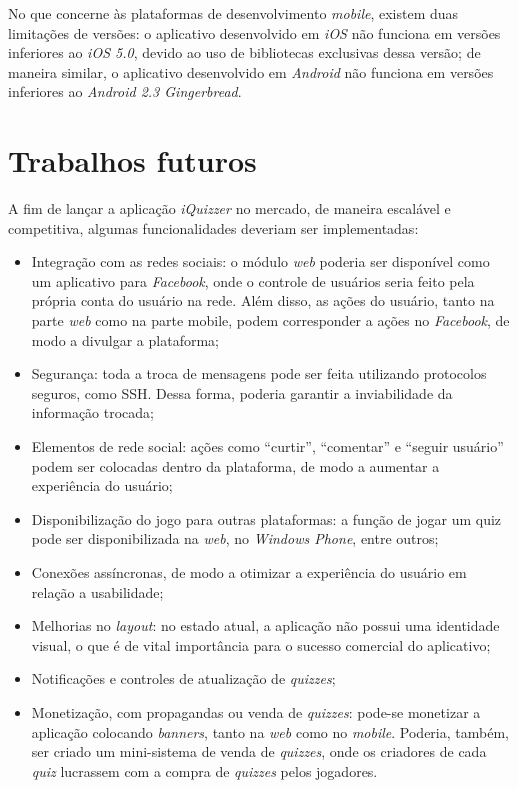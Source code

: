 	No que concerne às plataformas de desenvolvimento \emph{mobile}, existem duas limitações de versões: o aplicativo desenvolvido em \emph{iOS} não funciona em versões inferiores ao \emph{iOS 5.0}, devido ao uso de bibliotecas exclusivas dessa versão; de maneira similar, o aplicativo desenvolvido em \emph{Android} não funciona em versões inferiores ao \emph{Android 2.3 Gingerbread}.
	
 
\section{Trabalhos futuros}\label{SEC:FUTURO}
	A fim de lançar a aplicação \emph{iQuizzer} no mercado, de maneira escalável e competitiva, algumas funcionalidades deveriam ser implementadas:
\begin{itemize}
\item Integração com as redes sociais: o módulo \emph{web} poderia ser disponível como um aplicativo para \emph{Facebook}, onde o controle de usuários seria feito pela própria conta do usuário na rede. Além disso, as ações do usuário, tanto na parte \emph{web} como na parte mobile, podem corresponder a ações no \emph{Facebook}, de modo a divulgar a plataforma;
\item Segurança: toda a troca de mensagens pode ser feita utilizando protocolos seguros, como \ac{SSH}. Dessa forma, poderia garantir a inviabilidade da informação trocada;
\item Elementos de rede social: ações como ``curtir'', ``comentar'' e ``seguir usuário'' podem ser colocadas dentro da plataforma, de modo a aumentar a experiência do usuário;
\item Disponibilização do jogo para outras plataformas: a função de jogar um quiz pode ser disponibilizada na \emph{web}, no \emph{Windows Phone}, entre outros;
\item Conexões assíncronas, de modo a otimizar a experiência do usuário em relação a usabilidade;
\item Melhorias no \emph{layout}: no estado atual, a aplicação não possui uma identidade visual, o que é de vital importância para o sucesso comercial do aplicativo;
\item Notificações e controles de atualização de \emph{quizzes};
\item Monetização, com propagandas ou venda de \emph{quizzes}: pode-se monetizar a aplicação colocando \emph{banners}, tanto na \emph{web} como no \emph{mobile}. Poderia, também, ser criado um mini-sistema de venda de \emph{quizzes}, onde os criadores de cada \emph{quiz} lucrassem com a compra de \emph{quizzes} pelos jogadores.
\end{itemize}
